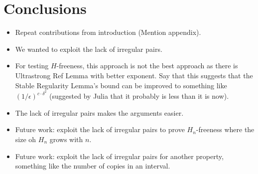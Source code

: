 \section{Conclusions} \label{sec:conclusions}
    \begin{itemize}
        \item Repeat contributions from introduction (Mention appendix).
        \item We wanted to exploit the lack of irregular pairs.
        \item For testing $H$-freeness, this approach is not the best approach as
            there is Ultrastrong Ref Lemma with better exponent.
            Say that this suggests that the Stable Regularity Lemma's bound can be improved
            to something like $(1/\epsilon)^{c \cdot \delta^2}$ (suggested by Julia that it
            probably is less than it is now).
        \item The lack of irregular pairs makes the arguments easier.
        \item Future work: exploit the lack of irregular pairs to prove $H_n$-freeness
            where the size oh $H_n$ grows with $n$.
        \item Future work: exploit the lack of irregular pairs for another property, something
            like the number of copies in an interval.
    \end{itemize}